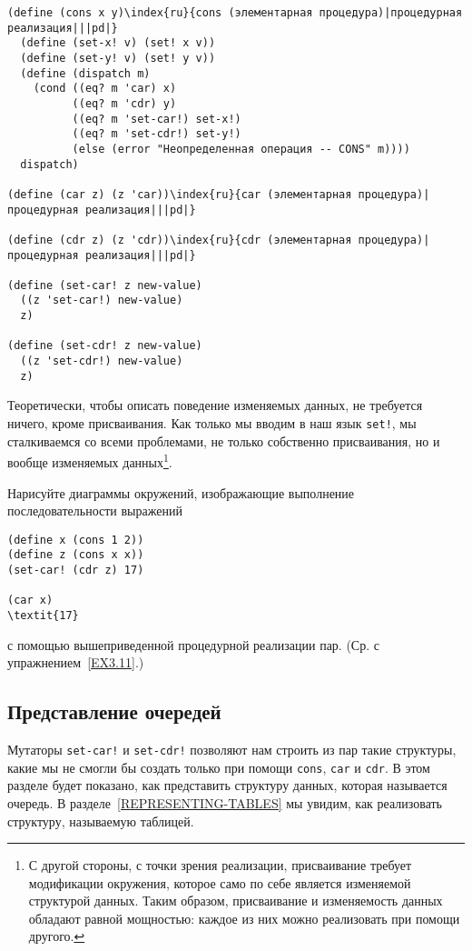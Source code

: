 \begin{Verbatim}[fontsize=\small]
(define (cons x y)\index{ru}{cons (элементарная процедура)|процедурная реализация|||pd|}
  (define (set-x! v) (set! x v))
  (define (set-y! v) (set! y v))
  (define (dispatch m)
    (cond ((eq? m 'car) x)
          ((eq? m 'cdr) y)
          ((eq? m 'set-car!) set-x!)
          ((eq? m 'set-cdr!) set-y!)
          (else (error "Неопределенная операция -- CONS" m))))
  dispatch)

(define (car z) (z 'car))\index{ru}{car (элементарная процедура)|процедурная реализация|||pd|}

(define (cdr z) (z 'cdr))\index{ru}{cdr (элементарная процедура)|процедурная реализация|||pd|}

(define (set-car! z new-value)
  ((z 'set-car!) new-value)
  z)

(define (set-cdr! z new-value)
  ((z 'set-cdr!) new-value)
  z)
\end{Verbatim}
\pagebreak

Теоретически, чтобы описать поведение изменяемых данных, не требуется
ничего, кроме присваивания.  Как только мы вводим в наш язык
{\tt set!}, мы сталкиваемся со всеми проблемами, не только
собственно присваивания, но и вообще изменяемых данных\footnote{С другой стороны, с точки зрения реализации,
присваивание требует модификации окружения, которое само по себе
является изменяемой структурой данных.  Таким образом, присваивание и
изменяемость данных обладают равной мощностью: каждое из них можно
реализовать при помощи другого.
}.
\begin{exercise}{3.20}\label{EX3.20}%
Нарисуйте диаграммы окружений, изображающие выполнение
последовательности выражений

\begin{Verbatim}[fontsize=\small]
(define x (cons 1 2))
(define z (cons x x))
(set-car! (cdr z) 17)

(car x)
\textit{17}
\end{Verbatim}
с помощью вышеприведенной процедурной реализации пар. (Ср. с
упражнением~\ref{EX3.11}.)
\end{exercise}

\subsection{Представление очередей}
\label{REPRESENTING-QUEUES}

Мутаторы {\tt set-car!} и {\tt set-cdr!}
позволяют нам строить из пар такие структуры, какие мы не смогли бы
создать только при помощи {\tt cons}, {\tt car} и
{\tt cdr}.  В этом разделе будет показано, как представить
структуру данных, которая называется очередь.  В
разделе~\ref{REPRESENTING-TABLES} мы увидим, как реализовать
структуру, называемую таблицей.


